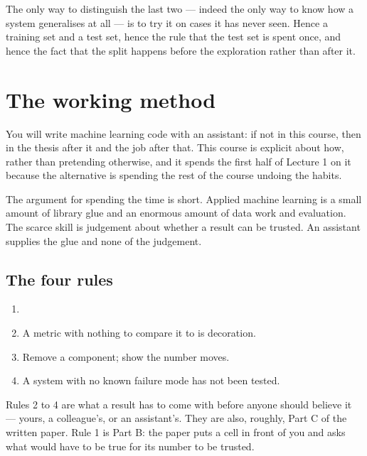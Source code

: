 \documentclass[11pt,a4paper]{article}
\begin{document}
The only way to distinguish the last two --- indeed the only way to know how a
system generalises at all --- is to try it on cases it has never seen. Hence a
training set and a test set, hence the rule that the test set is spent once,
and hence the fact that the split happens before the exploration rather than
after it.

\section{The working method}

You will write machine learning code with an assistant: if not in this course,
then in the thesis after it and the job after that. This course is explicit
about how, rather than pretending otherwise, and it spends the first half of
Lecture 1 on it because the alternative is spending the rest of the course
undoing the habits.

The argument for spending the time is short. Applied machine learning is a
small amount of library glue and an enormous amount of data work and
evaluation. The scarce skill is judgement about whether a result can be
trusted. An assistant supplies the glue and none of the judgement.

\subsection{The four rules}

\begin{keybox}[title={Four rules for AI-assisted work}]
\begin{enumerate}[leftmargin=1.6em,itemsep=2pt]
  \item {}
  \item {} A metric with nothing to compare
        it to is decoration.
  \item {} Remove a component; show the
        number moves.
  \item {} A system with no known failure mode
        has not been tested.
\end{enumerate}
\end{keybox}

Rules 2 to 4 are what a result has to come with before anyone should believe
it --- yours, a colleague's, or an assistant's. They are also, roughly, Part C
of the written paper. Rule 1 is Part B: the paper puts a cell in front of you
and asks what would have to be true for its number to be trusted.
\end{document}

